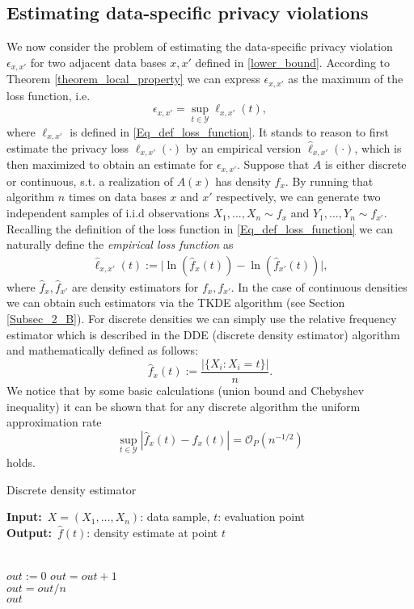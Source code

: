 \documentclass[conference]{IEEEtran}
\renewcommand{\algorithmicrequire}{\textbf{Input:}}
\renewcommand{\algorithmicensure}{\textbf{Output:}}
\begin{document}
\subsection{Estimating data-specific privacy violations} \label{subsec_41}

We now consider the problem of estimating the data-specific privacy violation $\epsilon_{x,x'}$ for two  adjacent data bases $x,x'$ defined in \eqref{lower_bound}. According to Theorem \ref{theorem_local_property} we can express $\epsilon_{x,x'}$ as the maximum of the loss function, i.e.
$$
\epsilon_{x,x'}=\sup_{t \in \mathcal{Y}} \ell_{x,x'}(t),
$$ 
where $ \ell_{x,x'}$ is defined in \eqref{Eq_def_loss_function}.
It stands to reason to first estimate the privacy loss $\ell_{x,x'}(\cdot)$ by an empirical version $\hat \ell_{x,x'}(\cdot)$, which is then maximized to obtain an estimate for $\epsilon_{x,x'}$. Suppose that $A$ is either discrete or continuous, s.t. a realization of $A(x)$ has density $f_x$. By running that algorithm $n$ times on data bases $x$ and $x'$ respectively, we can generate two independent samples of i.i.d observations $X_1,...,X_n \sim f_x$ and $Y_1,...,Y_n \sim f_{x'}$. Recalling the definition of the loss function in \eqref{Eq_def_loss_function} we can naturally define the \textit{empirical loss function} as
\begin{align} \label{Eq_def_emp_loss}
\hat{\ell}_{x,x'}(t) := \big| \ln (\hat f_x(t)) - \ln (\hat f_{x'}(t)) \big|,
\end{align}
where $\hat f_x, \hat f_{x'}$ are  density estimators for $f_x, f_{x'}$. In the case of continuous densities we can obtain such estimators via the TKDE algorithm (see Section \ref{Subsec_2_B}). For discrete densities we can simply use the relative frequency estimator which is described in the DDE (discrete density estimator) algorithm and mathematically defined as follows:
$$
\hat f_x (t) := \frac{|\{X_i: X_i=t\}|}{n}.
$$
We notice that by some basic calculations (union bound and Chebyshev inequality) it can be shown that for any discrete algorithm the uniform approximation rate
\begin{equation}\label{Eq_DDE_rate}
\sup_{t \in \mathcal{Y}} |\hat f_x (t)- f_x (t)| = \mathcal{O}_P(n^{-1/2})
\end{equation}
holds. 

\begin{algorithm}
	\caption{Discrete density estimator} \label{DDE}
	\small
	\algorithmicrequire \, $X=(X_1,...,X_n)$: data sample,   $t$: evaluation point \\
	\algorithmicensure \, $\hat{f}(t)$: density estimate at point $t$
	\begin{algorithmic}[1]
	\\
	    $out := 0$
				\State $out = out+ 1$
			\EndIf
		\EndFor \\
    
	$out = out/n$ \\
		\Return $out$
	\EndFunction
	\end{algorithmic} 
\end{algorithm}
\end{document}
